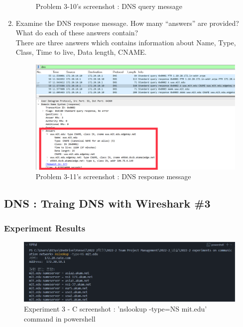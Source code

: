 \begin{enumerate}[label=\bfseries Problem \arabic*:,leftmargin=*,labelindent=1em]
\begin{figure}[!h]
        		\caption{\footnotesize Problem 3-10's screenshot : DNS query message}
        		\vspace{-10pt}
            \end{figure}
        \item Examine the DNS response message. 
        How many “answers” are provided? What do each of these answers contain?\\[0.2mm]
            \soln There are three answers which contains information about Name, Type, Class, Time to live, Data length, CNAME.
            \vspace{-2mm}  
            \begin{figure}[!h]\centering
        		\includegraphics[width=.73\textwidth]{image/result_week01/Q3-b.png}
        		\caption{\footnotesize Problem 3-11's screenshot : DNS response message}
        		\vspace{-10pt}
            \end{figure}
    \end{enumerate}
\subsection{DNS : Traing DNS with Wireshark \#3}
    \subsubsection*{Experiment Results}
        \vspace{-2mm}  
        \begin{figure}[!h]\centering
    		\includegraphics[width=.78\textwidth]{image/result_week01/Q3-c-0.png}
    		\caption{\footnotesize Experiment 3 - C screenshot : 'nslookup -type=NS mit.edu' command in powershell}
    		\vspace{-10pt}
        \end{figure}
\clearpage
